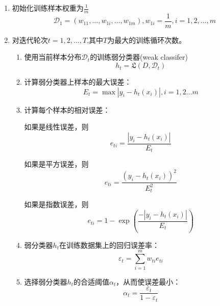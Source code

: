 \documentclass[withoutpreface,bwprint]{cumcmthesis} %
\begin{document}
\begin{enumerate}
	\item 初始化训练样本权重为$\frac{1}{m}$
	\begin{equation*}
		\mathcal{D}_{1}=\left(w_{11}, \ldots, w_{1 i}, \ldots, w_{1 m}\right), w_{1 i}=\frac{1}{m}, i=1,2, \ldots, m
	\end{equation*}
	
	\item 对迭代轮次${t = 1,2,\ldots, T}$,其中$T$为最大的训练循环次数。
	\begin{enumerate}
		\item 使用当前样本分布${\mathcal D}_t$的训练弱分类器(weak classifer)
		\begin{equation*}
		{h_t} = \mathfrak{L}\left( {D,{​{\mathcal D}_t}} \right)
		\end{equation*}		
		\item 计算弱分类器上样本的最大误差：
		\begin{equation*}
		 E _ { t} = \max \left| y _ { i } - h _ { t } \left( x _ { i } \right) \right|, i = 1,2 \ldots m
		 \end{equation*}
		 
		 \item 计算每个样本的相对误差：
		 
		  如果是线性误差，则
		  \begin{equation*}
		  e _ { t i } = \frac { \left| y _ { i } - h_t \left( x _ { i } \right) \right| } { E _ { t } }
		  \end{equation*}
		 
		 如果是平方误差，则
		 \begin{equation*}
		 e _ { t i } = \frac { \left( y _ { i } - h _ { t } \left( x _ { i } \right) \right) ^ { 2 } } { E _ { t } ^ { 2 }}
		\end{equation*}
		 
		 如果是指数误差，则
		 \begin{equation*}
		 e _ { t i } = 1 - \exp \left( \frac { - \left| y _ { i } - h _ {t } \left( x _ { i } \right) \right| } { E _ { t} } \right)
		\end{equation*}
		 
		 \item 弱分类器$h_t$在训练数据集上的回归误差率：
		 \begin{equation*}
		  \varepsilon _ { t } = \sum _ { i = 1 } ^ { m } w _ { t i } e _ { t i }
		 \end{equation*}
		
		 
		 \item 选择弱分类器$h_t$的合适阈值${\alpha _t}$，从而使误差最小：
		 \begin{equation*}
		  {\alpha _t} = \frac{​{​{\varepsilon _t}}}{​{1 - {\varepsilon _t}}}
		 \end{equation*}
		 

\end{enumerate}
\end{enumerate}
\end{document}
